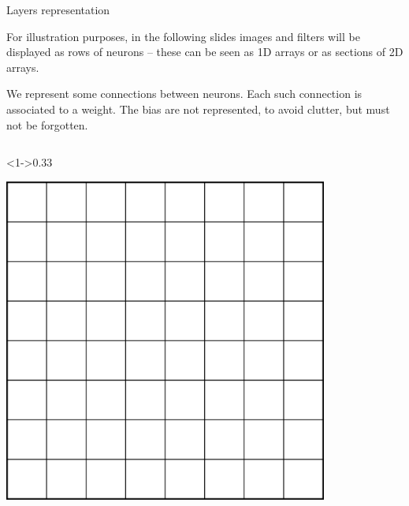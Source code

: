 \documentclass[xcolor=pdftex,dvipsnames,table,mathserif]{beamer}
\begin{document}
\begin{frame}{Layers representation}

  \begin{block}{}
    For illustration purposes, in the following slides images and filters will be displayed as rows of neurons -- these can be seen as 1D arrays or as sections of 2D arrays.

    We represent some connections between neurons. Each such connection is associated to a weight. The bias are not represented, to avoid clutter, but must not be forgotten.
  \end{block}

  \begin{columns}

    \begin{column}<1->{0.33\textwidth}
      \begin{center}
        \includegraphics[width=0.80\textwidth]{cnn_pixels.png}
      \end{center}
    \end{column}


\end{columns}
\end{frame}
\end{document}
